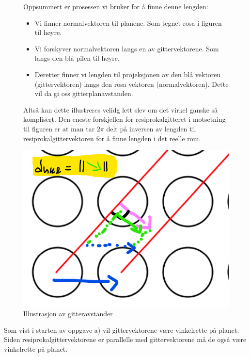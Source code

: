 \documentclass{article}
\begin{document}
\begin{figure}[h]
\begin{minipage}{0.55\textwidth}
Oppsummert er prosessen vi bruker for å finne denne lengden:
\begin{itemize}
\item Vi finner normalvektoren til planene. Som tegnet rosa i figuren til høyre.
\item Vi forskyver normalvektoren langs en av gittervektorene. Som langs den blå pilen til høyre.
\item Deretter finner vi lengden til projeksjonen av den blå vektoren (gittervektoren) langs den rosa vektoren (normalvektoren). Dette vil da gi oss gitterplanavstanden.
\end{itemize}
Altså kan dette illustreres velidg lett slev om det virkel ganske så komplisert. Den eneste forskjellen for resiprokalgitteret i motsetning til figuren er at man tar $2 \pi$ delt på inversen av lengden til resiprokalgittervektoren for å finne lengden i det reelle rom.
\end{minipage}
\begin{minipage}{0.4\textwidth}
\includegraphics[width=\textwidth]{bilder_lf/illustrasjon_av_gitteravstander.png}
\caption{Illustrasjon av gitteravstander}
\label{fig:illustrasjon_av_gitteravstander}
\end{minipage}
\end{figure}
Som vist i starten av oppgave a) vil gittervektorene være vinkelrette på planet. Siden resiprokalgittervektorene er parallelle med gittervektorene må de også være vinkelrette på planet.
\end{document}
